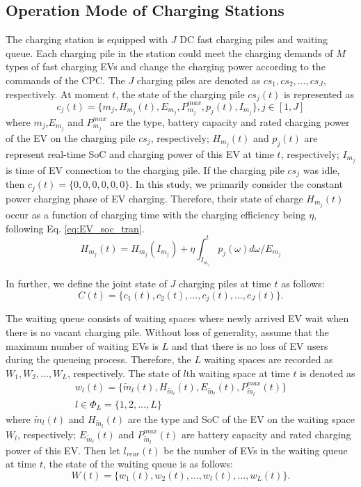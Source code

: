 \documentclass[preprint,12pt]{elsarticle}
\begin{document}
\subsection{Operation Mode of Charging Stations}
The charging station is equipped with $J$ DC fast charging piles
and waiting queue. Each charging pile in the station could meet the
charging demands of $M$ types of fast charging EVs and change the
charging power according to the commands of the CPC. The $J$ charging
piles are denoted as $cs_{1},cs_{2},\ldots,cs_{J}$, respectively.
At moment $t$, the state of the charging pile $cs_{j}(t)$ is represented
as
\begin{equation}
c_{j}(t)=\{m_{j},H_{m_{j}}(t),E_{m_{j}},P_{m_{j}}^{max},p_{j}(t),I_{m_{j}}\},j\in[1,J]\label{eq:cjt}
\end{equation}
where $m_{j}$,$E_{m_{j}}$ and $P_{m_{j}}^{max}$ are the type, battery
capacity and rated charging power of the EV on the charging pile $cs_{j}$,
respectively; $H_{m_{j}}(t)$ and $p_{j}(t)$ are represent real-time
SoC and charging power of this EV at time $t$, respectively; $I_{m_{j}}$
is time of EV connection to the charging pile. If the charging pile
$cs_{j}$ was idle, then $c_{j}(t)=\{0,0,0,0,0,0\}$. 
In this study, we primarily consider the constant power charging phase of EV charging.
Therefore, their state of charge $H_{m_{j}}(t)$ occur as a function of charging time with the charging efficiency being $\eta$, following Eq. \ref{eq:EV_soc_tran}. 
\begin{equation}
H_{m_{j}}(t)=H_{m_{j}}(I_{m_{j}})+\eta\int_{I_{m_{j}}}^{t}p_{j}(\omega)d\omega/E_{m_{j}}\label{eq:EV_soc_tran}
\end{equation}

In further, we define the joint state of $J$ charging piles at time $t$ as follows:
\[
C(t)=\{c_{1}(t),c_{2}(t),\ldots,c_{j}(t),\ldots,c_{J}(t)\}.
\]

The waiting queue consists of waiting spaces where newly arrived EV
wait when there is no vacant charging pile. Without loss of generality,
assume that the maximum number of waiting EVs is $L$ and that there
is no loss of EV users during the queueing process. Therefore, the
$L$ waiting spaces are recorded as $W_{1},W_{2},\ldots,W_{L}$, respectively.
The state of $l$th waiting space at time $t$ is denoted as
\begin{equation}
\begin{array}{c}
w_{l}(t)=\{\widetilde{m}_{l}(t),H_{\widetilde{m}_{l}}(t),E_{\widetilde{m}_{l}}(t),P_{\widetilde{m}_{l}}^{max}(t)\}\\
l\in\Phi_{L}=\{1,2,\ldots,L\}
\end{array}\label{eq:wlt}
\end{equation}
where $\widetilde{m}_{l}(t)$ and $H_{\widetilde{m}_{l}}(t)$ are
the type and SoC of the EV on the waiting space $W_{l}$, respectively;
$E_{\widetilde{m}_{l}}(t)$ and $P_{\widetilde{m}_{l}}^{max}(t)$
are battery capacity and rated charging power of this EV. Then let
$l_{rear}(t)$ be the number of EVs in the waiting queue at time $t$,
the state of the waiting queue is as follows:
\begin{equation}
W(t)=\{w_{1}(t),w_{2}(t),\ldots,w_{l}(t),\ldots,w_{L}(t)\}.\label{eq:wt}
\end{equation}
\end{document}
